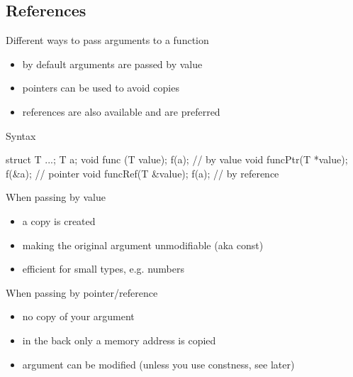 \subsection[Refs]{References}

\begin{frame}[fragile]
  \begin{block}{Different ways to pass arguments to a function}
    \begin{itemize}
    \item by default arguments are passed by value
    \item pointers can be used to avoid copies
    \item references are also available and are preferred
    \end{itemize}
  \end{block}
  \pause
  \begin{block}{Syntax}
    \begin{cppcode}
      struct T {...}; T a;
      void func   (T value); f(a);   // by value
      void funcPtr(T *value); f(&a); // pointer
      void funcRef(T &value); f(a);  // by reference
    \end{cppcode}
  \end{block}
\end{frame}

\begin{frame}[fragile]
  \begin{block}{When passing by value}
    \begin{itemize}
    \item a copy is created
    \item making the original argument unmodifiable (aka const)
    \item efficient for small types, e.g. numbers
    \end{itemize}
  \end{block}
  \begin{block}{When passing by pointer/reference}
    \begin{itemize}
    \item no copy of your argument
    \item in the back only a memory address is copied
    \item argument can be modified (unless you use constness, see later)
    \end{itemize}
  \end{block}
\end{frame}

